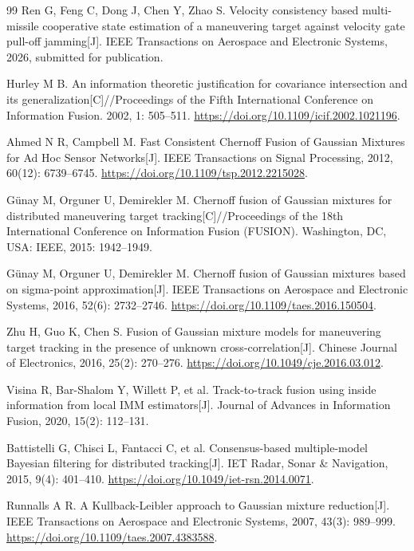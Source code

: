 \documentclass[UTF8,a4paper,zihao=-4]{ctexart}
\begin{document}
{\begin{thebibliography}{99}
 Ren G, Feng C, Dong J, Chen Y, Zhao S. Velocity consistency based multi-missile cooperative state estimation of a maneuvering target against velocity gate pull-off jamming[J]. IEEE Transactions on Aerospace and Electronic Systems, 2026, submitted for publication.

 Hurley M B. An information theoretic justification for covariance intersection and its generalization[C]//Proceedings of the Fifth International Conference on Information Fusion. 2002, 1: 505--511.
\url{https://doi.org/10.1109/icif.2002.1021196}.

 Ahmed N R, Campbell M. Fast Consistent Chernoff Fusion of Gaussian Mixtures for Ad Hoc Sensor Networks[J]. IEEE Transactions on Signal Processing, 2012, 60(12): 6739--6745.
\url{https://doi.org/10.1109/tsp.2012.2215028}.

 Günay M, Orguner U, Demirekler M. Chernoff fusion of Gaussian mixtures for distributed maneuvering target tracking[C]//Proceedings of the 18th International Conference on Information Fusion (FUSION). Washington, DC, USA: IEEE, 2015: 1942--1949.

 Günay M, Orguner U, Demirekler M. Chernoff fusion of Gaussian mixtures based on sigma-point approximation[J]. IEEE Transactions on Aerospace and Electronic Systems, 2016, 52(6): 2732--2746.
\url{https://doi.org/10.1109/taes.2016.150504}.

 Zhu H, Guo K, Chen S. Fusion of Gaussian mixture models for maneuvering target tracking in the presence of unknown cross-correlation[J]. Chinese Journal of Electronics, 2016, 25(2): 270--276.
\url{https://doi.org/10.1049/cje.2016.03.012}.

 Visina R, Bar-Shalom Y, Willett P, et al. Track-to-track fusion using inside information from local IMM estimators[J]. Journal of Advances in Information Fusion, 2020, 15(2): 112--131.

 Battistelli G, Chisci L, Fantacci C, et al. Consensus-based multiple-model Bayesian filtering for distributed tracking[J]. IET Radar, Sonar \& Navigation, 2015, 9(4): 401--410.
\url{https://doi.org/10.1049/iet-rsn.2014.0071}.

 Runnalls A R. A Kullback-Leibler approach to Gaussian mixture reduction[J]. IEEE Transactions on Aerospace and Electronic Systems, 2007, 43(3): 989--999.
\url{https://doi.org/10.1109/taes.2007.4383588}.


\end{thebibliography}}
\end{document}
